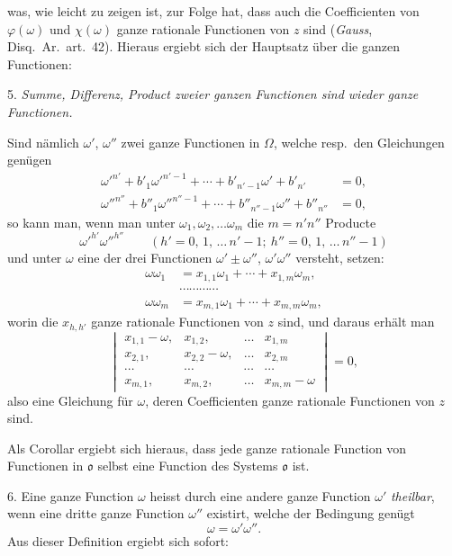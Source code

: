 \documentclass{article}
\begin{document}
was, wie leicht zu zeigen ist, zur Folge hat, dass auch die Coefficienten von $\varphi(\omega)$ und $\chi(\omega)$ ganze rationale Functionen von $z$ sind (\emph{Gauss}, Disq.\ Ar.\ art.~42). Hieraus ergiebt sich der Hauptsatz über die ganzen Functionen:

5. \emph{Summe, Differenz, Product zweier ganzen Functionen sind wieder ganze Functionen.}

Sind nämlich $\omega'$, $\omega''$ zwei ganze Functionen in $\Omega$, welche resp.\ den Gleichungen genügen
\[ \begin{aligned} \omega'^{n'} + b'_{1}\omega'^{n'-1} + \cdots + b'_{n'-1}\omega' + b'_{n'} &= 0, \\ \omega''^{n''} + b''_{1}\omega''^{n''-1} + \cdots + b''_{n''-1}\omega'' + b''_{n''} &= 0, \end{aligned} \]
so kann man, wenn man unter $\omega_{1}, \omega_{2}, \ldots \omega_{m}$ die $m = n'n''$ Producte
\[ \omega'^{h'}\omega''^{h''} \qquad {\scriptstyle (h' = 0,\, 1,\, \ldots\, n'-1;\ h'' = 0,\, 1,\, \ldots\, n''-1)} \]
und unter $\omega$ eine der drei Functionen $\omega' \pm \omega''$, $\omega'\omega''$ versteht, setzen:
\[ \begin{aligned} \omega\omega_{1} &= x_{1,1}\omega_{1} + \cdots + x_{1,m}\omega_{m}, \\ &\cdots\cdots\cdots\cdots \\ \omega\omega_{m} &= x_{m,1}\omega_{1} + \cdots + x_{m,m}\omega_{m}, \end{aligned} \]
worin die $x_{h,h'}$ ganze rationale Functionen von $z$ sind, und daraus erhält man
\[ \begin{vmatrix} x_{1,1}-\omega, & x_{1,2}, & \ldots & x_{1,m} \\ x_{2,1}, & x_{2,2}-\omega, & \ldots & x_{2,m} \\ \cdots & \cdots & \cdots & \cdots \\ x_{m,1}, & x_{m,2}, & \ldots & x_{m,m}-\omega \end{vmatrix} = 0, \]
also eine Gleichung für $\omega$, deren Coefficienten ganze rationale Functionen von $z$ sind.

Als Corollar ergiebt sich hieraus, dass jede ganze rationale Function von Functionen in $\mathfrak{o}$ selbst eine Function des Systems $\mathfrak{o}$ ist.

6. Eine ganze Function $\omega$ heisst durch eine andere ganze Function $\omega'$ \emph{theilbar}, wenn eine dritte ganze Function $\omega''$ existirt, welche der Bedingung genügt
\[ \omega = \omega'\omega''. \]
Aus dieser Definition ergiebt sich sofort:
\end{document}
